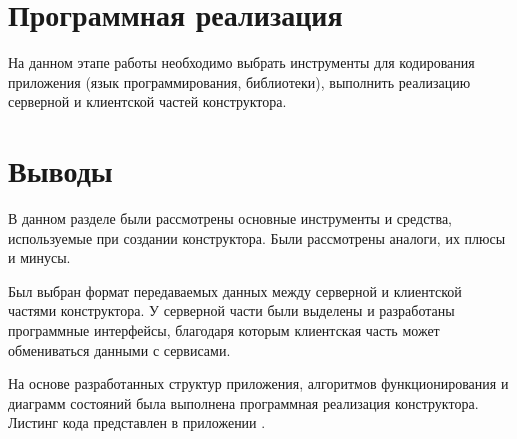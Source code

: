 
\newpage

\section{Программная реализация}

На данном этапе работы необходимо выбрать инструменты для
кодирования приложения (язык программирования, библиотеки), выполнить
реализацию серверной и клиентской частей конструктора.





\newpage

\section*{Выводы}

В данном разделе были рассмотрены основные
инструменты и средства, используемые при создании
конструктора. Были рассмотрены аналоги, их плюсы и
минусы.

Был выбран формат передаваемых данных между серверной и клиентской
частями конструктора. У серверной части были выделены и разработаны
программные интерфейсы,
благодаря которым клиентская часть может обмениваться данными с сервисами.

На основе разработанных структур приложения, алгоритмов
функционирования и диаграмм состояний была выполнена программная реализация конструктора.
Листинг кода представлен в приложении .

